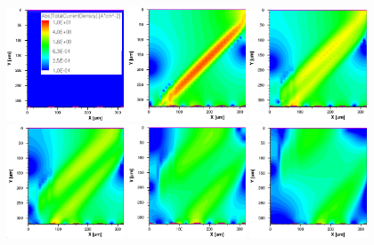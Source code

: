 \begin{figure}[ht!b]
  \centering
  \includegraphics[width=0.31\textwidth]{figures/silicon/silicon_t0.0.png}
  \includegraphics[width=0.31\textwidth]{figures/silicon/silicon_t1.1.png}
  \includegraphics[width=0.31\textwidth]{figures/silicon/silicon_t1.5.png}\\
  \includegraphics[width=0.31\textwidth]{figures/silicon/silicon_t2.0.png}
  \includegraphics[width=0.31\textwidth]{figures/silicon/silicon_t3.0.png}
  \includegraphics[width=0.31\textwidth]{figures/silicon/silicon_t4.0.png}\\

\end{figure}
